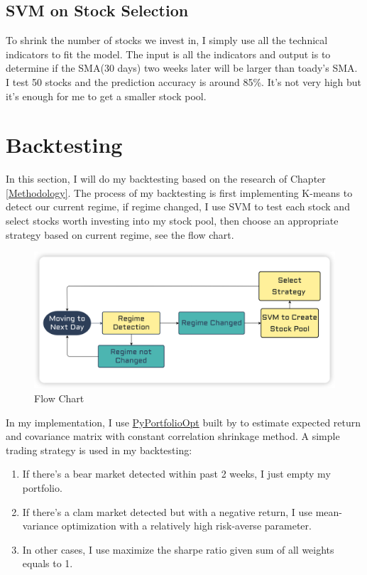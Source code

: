 \documentclass[a4paper,12pt]{article}
\begin{document}
\subsection{SVM on Stock Selection}

To shrink the number of stocks we invest in, I simply use all the technical indicators to fit the model. The input is all the indicators and output is to determine if the SMA(30 days) two weeks later will be larger than toady's SMA. I test 50 stocks and the prediction accuracy is around 85\%. It's not very high but it's enough for me to get a smaller stock pool.

\section{Backtesting}

In this section, I will do my backtesting based on the research of Chapter \ref{Methodology}. The process of my backtesting is first implementing K-means to detect our current regime, if regime changed, I use SVM to test each stock and select stocks worth investing into my stock pool, then choose an appropriate strategy based on current regime, see the flow chart.

\begin{figure}[H]
    \centering
    \includegraphics[scale=0.35]{invest.png}
    \caption{Flow Chart}\label{flow_chart}
\end{figure}

In my implementation, I use \href{https://pyportfolioopt.readthedocs.io/en/latest/}{PyPortfolioOpt} built by  \cite{Martin2021} to estimate expected return and covariance matrix with constant correlation shrinkage method. A simple trading strategy is used in my backtesting: 

\begin{enumerate}
    \item If there's a bear market detected within past 2 weeks, I just empty my portfolio.
    \item If there's a clam market detected but with a negative return, I use mean-variance optimization with a relatively high risk-averse parameter.
    \item In other cases, I use maximize the sharpe ratio given sum of all weights equals to 1.
  \end{enumerate}
\end{document}
